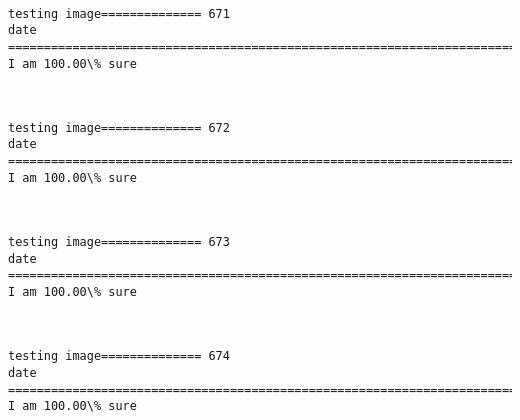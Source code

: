 \documentclass[11pt]{article}
\begin{document}
    \begin{center}
    \end{center}
    { \hspace*{\fill} \\}
    
    \begin{Verbatim}[commandchars=\\\{\}]
testing image============== 671
date
============================================================================
I am 100.00\% sure

    \end{Verbatim}

    \begin{center}
    \end{center}
    { \hspace*{\fill} \\}
    
    \begin{Verbatim}[commandchars=\\\{\}]
testing image============== 672
date
============================================================================
I am 100.00\% sure

    \end{Verbatim}

    \begin{center}
    \end{center}
    { \hspace*{\fill} \\}
    
    \begin{Verbatim}[commandchars=\\\{\}]
testing image============== 673
date
============================================================================
I am 100.00\% sure

    \end{Verbatim}

    \begin{center}
    \end{center}
    { \hspace*{\fill} \\}
    
    \begin{Verbatim}[commandchars=\\\{\}]
testing image============== 674
date
============================================================================
I am 100.00\% sure

    \end{Verbatim}
\end{document}
